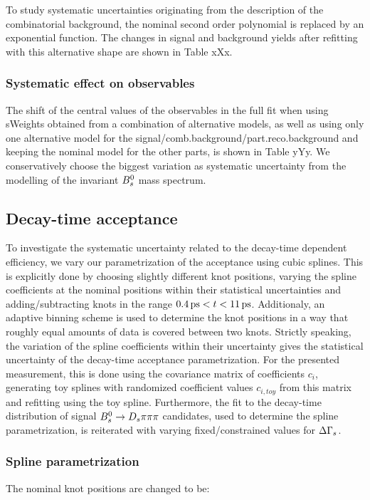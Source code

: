 To study systematic uncertainties originating from the description of the combinatorial background, the nominal second order polynomial is replaced by an exponential function. 
The changes in signal and background yields after refitting with this alternative shape are shown in Table xXx. \newline

\subsubsection{Systematic effect on observables}

The shift of the central values of the observables in the full fit when using sWeights obtained from a combination of alternative models, 
as well as using only one alternative model for the signal/comb.background/part.reco.background and keeping the nominal model for the other parts,
is shown in Table yYy. We conservatively choose the biggest variation as systematic uncertainty from the modelling of the invariant ${{B}^0_{s}}$ mass spectrum.



\subsection{Decay-time acceptance}
\label{subsec:SystTime}

To investigate the systematic uncertainty related to the decay-time dependent efficiency, we vary our parametrization of the acceptance using cubic splines.
This is explicitly done by choosing slightly different knot positions, 
varying the spline coefficients at the nominal positions within their statistical uncertainties and adding/subtracting knots in the range $0.4{\mathrm{ \,ps}} < t < 11{\mathrm{ \,ps}}$.
Additionaly, an adaptive binning scheme is used to determine the knot positions in a way that roughly equal amounts of data is covered between two knots.
Strictly speaking, the variation of the spline coefficients within their uncertainty gives the statistical uncertainty of the decay-time acceptance parametrization.
For the presented measurement, this is done using the covariance matrix of coefficients $c_{i}$, generating toy splines with randomized coefficient values $c_{i,toy}$ from this matrix and refitting using the toy spline.  
Furthermore, the fit to the decay-time distribution of signal ${{B}^0_{s}}\rightarrow{\ensuremath{{D}_{s}}}{\ensuremath{\pi}}{\ensuremath{\pi}}{\ensuremath{\pi}}$ candidates, used to determine the spline parametrization, is reiterated with varying fixed/constrained values for ${\Delta\Gamma_{{s}}}$.


\subsubsection{Spline parametrization}
The nominal knot positions are changed to be:

